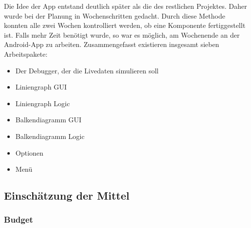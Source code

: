 Die Idee der App entstand deutlich später als die des restlichen Projektes. Daher wurde bei der Planung in Wochenschritten gedacht. Durch diese Methode konnten alle zwei Wochen kontrolliert werden, ob eine Komponente fertiggestellt ist. Falls mehr Zeit benötigt wurde, so war es möglich, am Wochenende an der Android-App zu arbeiten. Zusammengefasst existieren insgesamt sieben Arbeitspakete:
\begin{itemize}
	\item Der Debugger, der die Livedaten simulieren soll
	\item Liniengraph GUI
	\item Liniengraph Logic
	\item Balkendiagramm GUI
	\item Balkendiagramm Logic
	\item Optionen
	\item Menü
\end{itemize}

\subsection{Einschätzung der Mittel}
\subsubsection{Budget}
\label{subsubsec:Budget}

